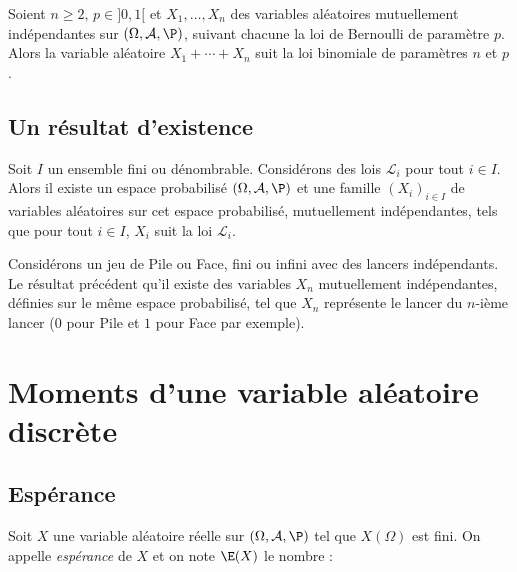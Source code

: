 \documentclass[a4paper,10pt]{report}
\begin{document}
\begin{prop} Soient $n \geq 2$, $p \in ]0,1[$ et $X_1, \ldots, X_n$ des variables aléatoires mutuellement indépendantes sur $(\Omega, \mathcal{A}, \P)$, suivant chacune la loi de Bernoulli de paramètre $p$. Alors la variable aléatoire $X_1+ \cdots + X_n$ suit la loi binomiale de paramètres $n$ et $p$.
\end{prop}

\begin{preuve}
\vspace{3cm}
\end{preuve}

\subsection{Un résultat d'existence}

\begin{thm} Soit $I$ un ensemble fini ou dénombrable. Considérons des lois $\mathcal{L}_i$ pour tout $i \in I$. Alors il existe un espace probabilisé $(\Omega, \mathcal{A}, \P)$ et une famille $(X_i)_{i \in I}$ de variables aléatoires sur cet espace probabilisé, mutuellement indépendantes, tels que pour tout $i \in I$, $X_i$ suit la loi $\mathcal{L}_i$.
\end{thm}

\begin{ex} Considérons un jeu de Pile ou Face, fini ou infini avec des lancers indépendants. Le résultat précédent qu'il existe des variables $X_n$ mutuellement indépendantes, définies sur le même espace probabilisé, tel que $X_n$ représente le lancer du $n$-ième lancer ($0$ pour Pile et $1$ pour Face par exemple).
\end{ex}







\section{Moments d'une variable aléatoire discrète}



\subsection{Espérance}


\begin{defin}
Soit $X$ une variable aléatoire réelle sur $(\Omega, \mathcal{A}, \P)$ tel que $X(\Omega)$ est fini. On appelle \textit{espérance} de $X$ et on note $\E(X)$ le nombre :
 $$ \phantom{\E (X) = \sum_{x \in X(\Omega)}x  \P\big(X=x\big)}$$
\end{defin}
\end{document}
